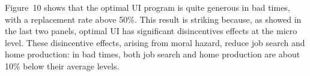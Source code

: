 \documentclass[letterpaper,12pt,leqno]{article}
\def\path{../}
\begin{document}
Figure~10 shows that the optimal UI program is quite generous in bad times, with a replacement rate above 50\%. This result is striking because, as showed in the last two panels, optimal UI has significant disincentives effects at the micro level. These disincentive effects, arising from moral hazard, reduce job search and home production: in bad times, both job search and home production are about 10\% below their average levels. 

\begin{small}\end{small}
\end{document}
